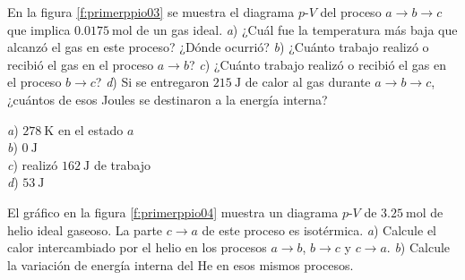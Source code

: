 %
\begin{Exercise}\label{p:primerppio03}
  En la figura \ref{f:primerppio03} se muestra el diagrama $p$-$V$ del proceso $a\rightarrow b \rightarrow c$ que implica $\SI{0.0175}{\mole}$ de un gas ideal. \textit{a}) ¿Cuál fue la temperatura más baja que alcanzó el gas en  este proceso? ¿Dónde ocurrió? \textit{b}) ¿Cuánto trabajo realizó o recibió el gas en el proceso $a \rightarrow b$? \textit{c}) ¿Cuánto trabajo realizó o recibió el gas en el proceso $b \rightarrow c$? \textit{d}) Si se entregaron $\SI{215}{\joule}$ de calor al gas durante $a\rightarrow b \rightarrow c$, ¿cuántos de esos Joules se destinaron a la energía interna?
\end{Exercise}
\begin{Answer}
	\begin{minipage}[t]{.4\textwidth}
    \textit{a}) $\SI{278}{\kelvin}$ en el estado $a$\\ \textit{b}) $\SI{0}{\joule}$\\ \textit{c}) realizó $\SI{162}{\joule}$ de trabajo\\ \textit{d}) $\SI{53}{\joule}$
  \end{minipage}
\end{Answer}
%
\begin{center}
\end{center}
%
\begin{Exercise}\label{p:primerppio04}
  {}{}
  El gráfico en la figura \ref{f:primerppio04} muestra un diagrama $p$-$V$ de $\SI{3.25}{\mole}$ de helio ideal gaseoso. La parte $c \rightarrow a$ de este proceso es isotérmica. \textit{a}) Calcule el calor intercambiado por el helio en los procesos $a \rightarrow b$, $b \rightarrow c$ y $c \rightarrow a$. \textit{b}) Calcule la variación de energía interna del He en esos mismos procesos.
\end{Exercise}

